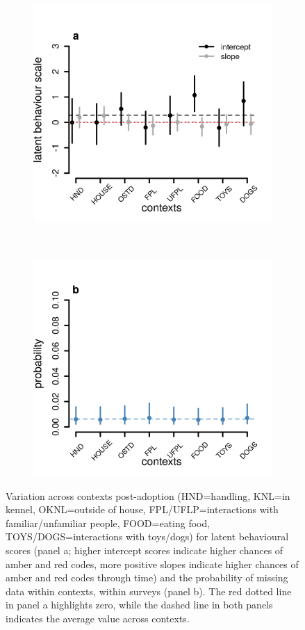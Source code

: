 \documentclass[12pt]{article}
\begin{document}
\begin{figure}[]
  \centering
  \begin{subfigure}{0.5\textwidth}
    \includegraphics[scale=0.6]{figures/figure_S2_a}
  \end{subfigure}%
  ~
  \begin{subfigure}{0.5\textwidth}
    \includegraphics[scale=0.6]{figures/figure_S2_b}
  \end{subfigure}%
\caption{Variation across contexts post-adoption  (HND=handling, KNL=in kennel, OKNL=outside of house, FPL/UFLP=interactions with familiar/unfamiliar people, FOOD=eating food, TOYS/DOGS=interactions with toys/dogs) for latent behavioural scores (panel a; higher intercept scores indicate higher chances of amber and red codes, more positive slopes indicate higher chances of amber and red codes through time) and the probability of missing data within contexts, within surveys (panel b). The red dotted line in panel a highlights zero, while the dashed line in both panels indicates the average value across contexts.
}
\label{fig_2}
\end{figure}
\end{document}
